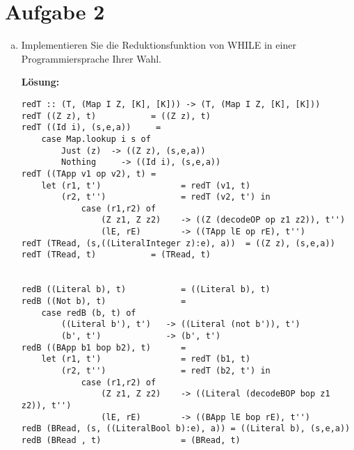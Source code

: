 \documentclass[11pt,a4paper,ngerman]{article}
\begin{document}

\section*{Aufgabe 2}
\begin{enumerate}[a)]
    \item   Implementieren Sie die Reduktionsfunktion von WHILE in einer Programmiersprache
            Ihrer Wahl.

            \textbf{Lösung:}\\
            \begin{lstlisting}
redT :: (T, (Map I Z, [K], [K])) -> (T, (Map I Z, [K], [K]))
redT ((Z z), t)           = ((Z z), t)
redT ((Id i), (s,e,a))     = 
    case Map.lookup i s of
        Just (z)  -> ((Z z), (s,e,a))
        Nothing     -> ((Id i), (s,e,a))
redT ((TApp v1 op v2), t) =
    let (r1, t')                = redT (v1, t)
        (r2, t'')               = redT (v2, t') in
            case (r1,r2) of
                (Z z1, Z z2)    -> ((Z (decodeOP op z1 z2)), t'')
                (lE, rE)        -> ((TApp lE op rE), t'')
redT (TRead, (s,((LiteralInteger z):e), a))  = ((Z z), (s,e,a))
redT (TRead, t)           = (TRead, t)
        

redB ((Literal b), t)           = ((Literal b), t)
redB ((Not b), t)               = 
    case redB (b, t) of
        ((Literal b'), t')   -> ((Literal (not b')), t')
        (b', t')             -> (b', t')
redB ((BApp b1 bop b2), t)      =
    let (r1, t')                = redT (b1, t)
        (r2, t'')               = redT (b2, t') in
            case (r1,r2) of
                (Z z1, Z z2)    -> ((Literal (decodeBOP bop z1 z2)), t'')
                (lE, rE)        -> ((BApp lE bop rE), t'')
redB (BRead, (s, ((LiteralBool b):e), a)) = ((Literal b), (s,e,a))
redB (BRead , t)                = (BRead, t)


\end{lstlisting}
\end{enumerate}
\end{document}
